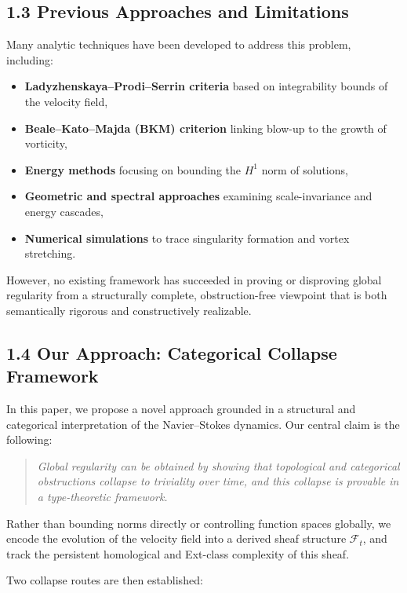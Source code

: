 \documentclass[11pt]{article}
\begin{document}
\subsection{1.3 Previous Approaches and Limitations}

Many analytic techniques have been developed to address this problem, including:

\begin{itemize}
  \item \textbf{Ladyzhenskaya–Prodi–Serrin criteria} based on integrability bounds of the velocity field,
  \item \textbf{Beale–Kato–Majda (BKM) criterion} linking blow-up to the growth of vorticity,
  \item \textbf{Energy methods} focusing on bounding the \( H^1 \) norm of solutions,
  \item \textbf{Geometric and spectral approaches} examining scale-invariance and energy cascades,
  \item \textbf{Numerical simulations} to trace singularity formation and vortex stretching.
\end{itemize}

However, no existing framework has succeeded in proving or disproving global regularity from a structurally complete, obstruction-free viewpoint that is both semantically rigorous and constructively realizable.

\subsection{1.4 Our Approach: Categorical Collapse Framework}

In this paper, we propose a novel approach grounded in a structural and categorical interpretation of the Navier--Stokes dynamics. Our central claim is the following:

\begin{quote}
\textit{Global regularity can be obtained by showing that topological and categorical obstructions collapse to triviality over time, and this collapse is provable in a type-theoretic framework.}
\end{quote}

Rather than bounding norms directly or controlling function spaces globally, we encode the evolution of the velocity field into a derived sheaf structure \( \mathcal{F}_t \), and track the persistent homological and Ext-class complexity of this sheaf.

Two collapse routes are then established:
\end{document}
